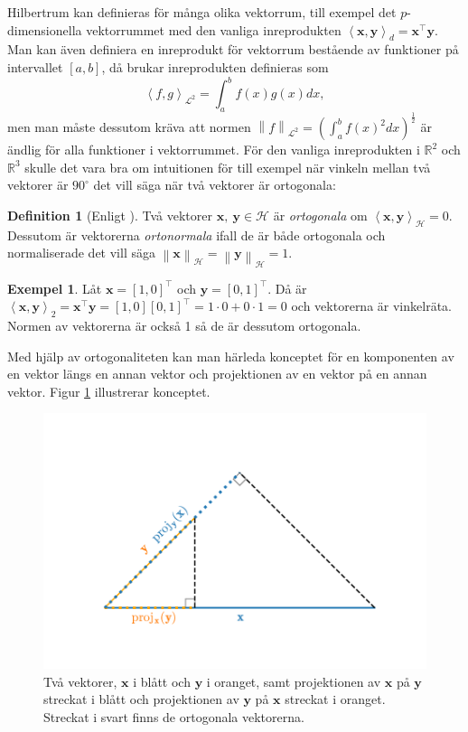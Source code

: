 \documentclass[a4paper, 12pt]{report}
\theoremstyle{definition}
\newtheorem{defi}{Definition}[section]
\newtheorem{ex}{Exempel}[section]
\theoremstyle{remark}
\newcommand{\bfx}{\mathbf{x}}
\newcommand{\bfy}{\mathbf{y}}
\newcommand{\llangle}{\left\langle}
\newcommand{\rrangle}{\right\rangle}
\newcommand{\inner}[2]{\llangle #1, #2 \rrangle}
\newcommand{\hil}{\mathcal{H}}
\begin{document}
Hilbertrum kan definieras för många olika vektorrum, till exempel det $p$-dimensionella vektorrummet med den vanliga inreprodukten $\left\langle \mathbf{x}, \mathbf{y} \right\rangle_d = \mathbf{x}^\intercal\mathbf{y}$.
Man kan även definiera en inreprodukt för vektorrum bestående av funktioner på intervallet $\left[a,b\right]$, då brukar inreprodukten definieras som
\begin{equation*}
\left\langle f, g \right\rangle_{\mathcal{L}^2}=\int_{a}^{b}f\left(x\right)g\left(x\right) dx,
\end{equation*}
men man måste dessutom kräva att normen $\left\|f\right\|_{\mathcal{L}^2} = \left(\int_{a}^{b}f\left(x\right)^2dx\right)^{\frac{1}{2}}$ är ändlig för alla funktioner i vektorrummet. För den vanliga inreprodukten i $\mathbb{R}^2$ och $\mathbb{R}^3$ skulle det vara bra om intuitionen för till exempel när vinkeln mellan två vektorer är $90^\circ$ det vill säga när två vektorer är ortogonala:

\begin{defi}[Enligt \cite{Lang}]
	Två vektorer $\bfx, ~\bfy\in\hil$ är \emph{ortogonala} om $\inner{\bfx}{\bfy}_\hil=0$. Dessutom är vektorerna \emph{ortonormala} ifall de är både ortogonala och normaliserade det vill säga $\left\|\bfx\right\|_\hil=\left\|\bfy\right\|_\hil=1$.
\end{defi}
\begin{ex}
	Låt $\bfx=\left[1,0\right]^\intercal$ och $\bfy=\left[0,1\right]^\intercal$. Då är $\inner{\bfx}{\bfy}_2=\bfx^\intercal\bfy=\left[1,0\right]\left[0,1\right]^\intercal = 1\cdot0 + 0\cdot1=0$ och vektorerna är vinkelräta. Normen av vektorerna är också 1 så de är dessutom ortogonala.
\end{ex}

Med hjälp av ortogonaliteten kan man härleda konceptet för en komponenten av en vektor längs en annan vektor och projektionen av en vektor på en annan vektor.
Figur \ref{fig:proj} illustrerar konceptet.

\begin{figure}[h]
	\centering
	\includegraphics[width=0.8\linewidth, trim={2.1cm 17mm 2cm 20mm}, clip]{KandFigur4.pdf}
	\caption{\label{fig:proj}Två vektorer, $\bfx$ i blått och $\bfy$ i oranget, samt projektionen av $\bfx$ på $\bfy$ streckat i blått och projektionen av $\bfy$ på $\bfx$ streckat i oranget. Streckat i svart finns de ortogonala vektorerna.}
\end{figure}
\end{document}
